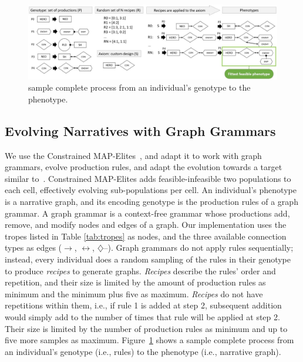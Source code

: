 \begin{figure}[t]
    \centering
    \includegraphics[width=\textwidth]{figures/gen2seq.jpg}
    \caption{sample complete process from an individual's genotype to the phenotype.}
    \label{fig:gen2phen}
\end{figure}


\subsection{Evolving Narratives with Graph Grammars} \label{sec:evolvingNarratives}

We use the Constrained MAP-Elites~\cite{p12Khalifa2018}, and adapt it to work with graph grammars, evolve production rules, and adapt the evolution towards a target similar to~\cite{p12Alvarez2020-ICMAPE}. Constrained MAP-Elites adds feasible-infeasible two populations to each cell, effectively evolving sub-populations per cell. An individual's phenotype is a narrative graph, and its encoding genotype is the production rules of a graph grammar. A graph grammar is a context-free grammar whose productions add, remove, and modify nodes and edges of a graph. Our implementation uses the tropes listed in Table \ref{tab:tropes} as nodes, and the three available connection types as edges ($\rightarrow$, $\leftrightarrow$, $\diamondsuit$--). Graph grammars do not apply rules sequentially; instead, every individual does a random sampling of the rules in their genotype to produce \emph{recipes} to generate graphs. \emph{Recipes} describe the rules' order and repetition, and their size is limited by the amount of production rules as minimum and the minimum plus five as maximum. \emph{Recipes} do not have repetitions within them, i.e., if rule 1 is added at step 2, subsequent addition would simply add to the number of times that rule will be applied at step 2. Their size is limited by the number of production rules as minimum and up to five more samples as maximum. Figure~\ref{fig:gen2phen} shows a sample complete process from an individual's genotype (i.e., rules) to the phenotype (i.e., narrative graph).

